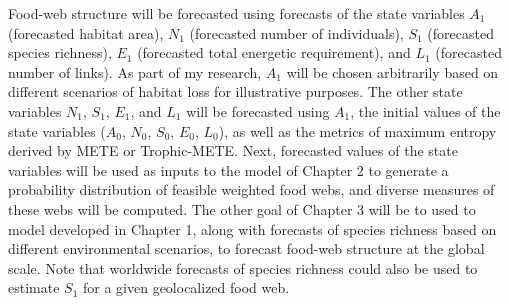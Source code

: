Food-web structure will be forecasted using forecasts of the
state variables $A_1$ (forecasted habitat area), $N_1$ (forecasted
number of individuals), $S_1$ (forecasted species richness), $E_1$
(forecasted total energetic requirement), and $L_1$ (forecasted number
of links). As part of my research, $A_1$ will be chosen arbitrarily
based on different scenarios of habitat loss for illustrative purposes.
The other state variables $N_1$, $S_1$, $E_1$, and $L_1$ will be
forecasted using $A_1$, the initial values of the state variables
($A_0$, $N_0$, $S_0$, $E_0$, $L_0$), as well as the metrics of maximum
entropy derived by METE or Trophic-METE. Next, forecasted values of the
state variables will be used as inputs to the model of Chapter 2 to
generate a probability distribution of feasible weighted food webs, and
diverse measures of these webs will be computed. The other goal of
Chapter 3 will be to used to model developed in Chapter 1, along with
forecasts of species richness based on different environmental
scenarios, to forecast food-web structure at the global scale. Note that
worldwide forecasts of species richness could also be used to estimate
$S_1$ for a given geolocalized food web.

